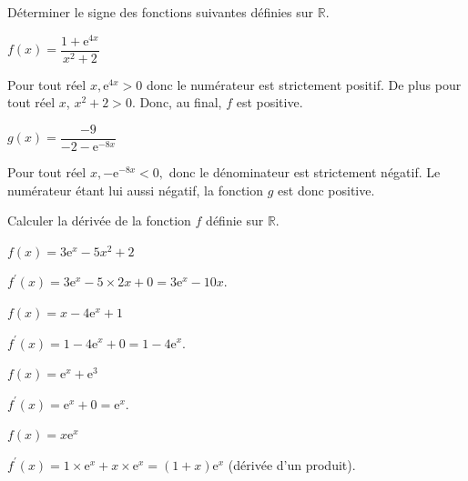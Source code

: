 \documentclass[11pt,a4paper]{article}  %
\begin{document}
Déterminer le signe des fonctions suivantes définies sur $\mathbb{R}$.
\begin{enumMet}
	\item $f(x)=\dfrac{1+\mathrm{e}^{4 x}}{x^2+2}$
	\begin{corrBox}
		Pour tout réel $x, \mathrm{e}^{4 x}>0$ donc le numérateur est strictement positif. De plus pour tout réel $x$, $x^{2}+2>0$. Donc, au final, $f$ est positive.		
	\end{corrBox}
	\item $g(x)=\dfrac{-9}{-2-\mathrm{e}^{-8 x}}$
	\begin{corrBox}
		Pour tout réel $x,-\mathrm{e}^{-8 x}<0,$ donc le dénominateur est strictement négatif. Le numérateur étant lui aussi négatif, la fonction $g$ est donc positive.		
	\end{corrBox}
\end{enumMet}


Calculer la dérivée de la fonction $f$ définie sur $\mathbb{R}$.
\begin{enumMet}
	\item $f(x)=3 \mathrm{e}^x-5 x^2+2$
	\begin{corrBox}
		$f^{\prime}(x)=3 \mathrm{e}^x-5 \times 2 x+0=3 \mathrm{e}^x-10 x$.		
	\end{corrBox}
	\item $f(x)=x-4 \mathrm{e}^x+1$
	\begin{corrBox}
		$f^{\prime}(x)=1-4 \mathrm{e}^x+0=1-4 \mathrm{e}^x$.		
	\end{corrBox}
	\item $f(x)=\mathrm{e}^x+\mathrm{e}^3$
	\begin{corrBox}
		$f^{\prime}(x)=\mathrm{e}^x+0=\mathrm{e}^x$.		
	\end{corrBox}
	\item $f(x)=x \mathrm{e}^x$
	\begin{corrBox}
		$f^{\prime}(x)=1 \times \mathrm{e}^x+x \times \mathrm{e}^x=(1+x) \mathrm{e}^x$
		 (dérivée d'un produit).		
	\end{corrBox}
\end{enumMet}


\end{document}
